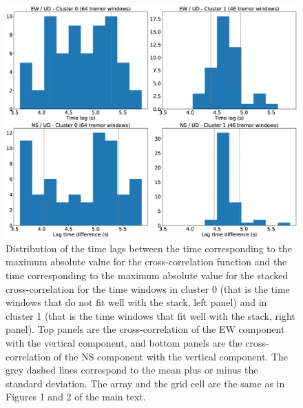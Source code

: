 \documentclass[draft]{agujournal2019}
\begin{document}
\begin{figure}
\noindent\includegraphics[width=\textwidth, trim={0cm 0cm 0cm 0cm},clip]{figures/BS_-05_-05_PWS_PWS_cluster_timelags.eps}
\caption{Distribution of the time lags between the time corresponding to the maximum absolute value for the cross-correlation function and the time corresponding to the maximum absolute value for the stacked cross-correlation for the time windows in cluster 0 (that is the time windows that do not fit well with the stack, left panel) and in cluster 1 (that is the time windows that fit well with the stack, right panel). Top panels are the cross-correlation of the EW component with the vertical component, and bottom panels are the cross-correlation of the NS component with the vertical component. The grey dashed lines correspond to the mean plus or minus the standard deviation. The array and the grid cell are the same as in Figures 1 and 2 of the main text.}
\label{pngfiguresample}
\end{figure}


\end{document}
